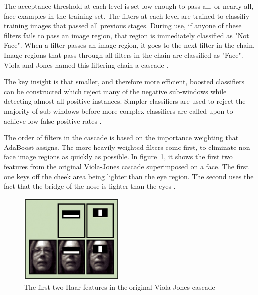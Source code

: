 \noindent The acceptance threshold at each level is set low enough to pass all, or nearly all, face examples in the training set. The filters at each level are trained to classifiy training images that passed all previous stages. During use, if anyone of these filters fails to pass an image region, that region is immediately classified as "Not Face". When a filter passes an image region, it goes to the next filter in the chain. Image regions that pass through all filters in the chain are classified as "Face". Viola and Jones named this filtering chain a cascade \cite{HEW07}.
\newline

\noindent The key insight is that smaller, and therefore more efficient, boosted classifiers can be constructed which reject many of the negative sub-windows while detecting almost all positive instances. Simpler classifiers are used to reject the majority of sub-windows before more complex classifiers are called upon to achieve low false positive rates \cite{VIO01}.
\newline

\noindent The order of filters in the cascade is based on the importance weighting that AdaBoost assigns. The more heavily weighted filters come first, to eliminate non-face image regions as quickly as possible. In figure~\ref{haar_feature_first_2_features}, it shows the first two features from the original Viola-Jones cascade superimposed on a face. The first one keys off the cheek area being lighter than the eye region. The second uses the fact that the bridge of the nose is lighter than the eyes \cite{HEW07}.
\newline

\begin{figure}[!h]
\begin{center}
\noindent \includegraphics[scale=1]{figures/haar_feature_first_2_features} 
\newline
\caption{The first two Haar features in the original Viola-Jones cascade}
\label{haar_feature_first_2_features}
\end{center} 
\end{figure}

